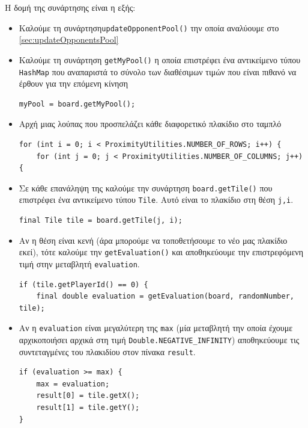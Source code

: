 Η δομή της συνάρτησης είναι η εξής:\begin{itemize}
\item Καλούμε τη συνάρτηση\lstinline!updateOpponentPool()! την
οποία αναλύουμε στο \hyperref[sec:updateOpponentsPool]{\ref{sec:updateOpponentsPool}}

\item Καλούμε τη συνάρτηση \lstinline!getMyPool()! η οποία επιστρέφει ένα αντικείμενο τύπου \lstinline!HashMap! που αναπαριστά το σύνολο των διαθέσιμων τιμών που είναι πιθανό να έρθουν για την επόμενη κίνηση
\begin{lstlisting}[numbers=none, aboveskip=\smallskipamount, belowskip=\smallskipamount, captionpos=none]
myPool = board.getMyPool();
\end{lstlisting}

\item Αρχή μιας λούπας που προσπελάζει κάθε διαφορετικό πλακίδιο στο ταμπλό
\begin{lstlisting}[numbers=none, aboveskip=\smallskipamount, belowskip=\smallskipamount, captionpos=none]
for (int i = 0; i < ProximityUtilities.NUMBER_OF_ROWS; i++) {
    for (int j = 0; j < ProximityUtilities.NUMBER_OF_COLUMNS; j++) {
\end{lstlisting}

\item Σε κάθε επανάληψη της καλούμε την συνάρτηση \lstinline!board.getTile()! που επιστρέφει ένα αντικείμενο τύπου \lstinline!Tile!. Αυτό είναι το πλακίδιο στη θέση \lstinline!j,i!.
\begin{lstlisting}[numbers=none, aboveskip=\smallskipamount, belowskip=\smallskipamount, captionpos=none]
final Tile tile = board.getTile(j, i);
\end{lstlisting}

\item Αν η θέση είναι κενή (άρα μπορούμε να τοποθετήσουμε το νέο μας πλακίδιο εκεί),
τότε καλούμε την \lstinline!getEvaluation()! και αποθηκεύουμε την επιστρεφόμενη τιμή
στην μεταβλητή \lstinline!evaluation!.
\begin{lstlisting}[breaklines=true, numbers=none, aboveskip=\smallskipamount, belowskip=\smallskipamount, captionpos=none]
if (tile.getPlayerId() == 0) {
    final double evaluation = getEvaluation(board, randomNumber, tile);
\end{lstlisting}

\item Αν η \lstinline!evaluation! είναι μεγαλύτερη της
\lstinline!max! (μία μεταβλητή την οποία έχουμε αρχικοποιήσει αρχικά στη τιμή \lstinline!Double.NEGATIVE_INFINITY!) αποθηκεύουμε
τις συντεταγμένες του πλακιδίου στον πίνακα \lstinline!result!.
\begin{lstlisting}[breaklines=true, numbers=none, aboveskip=\smallskipamount, belowskip=\smallskipamount, captionpos=none]
if (evaluation >= max) {
    max = evaluation;
    result[0] = tile.getX();
    result[1] = tile.getY();
}
\end{lstlisting}


\end{itemize}
